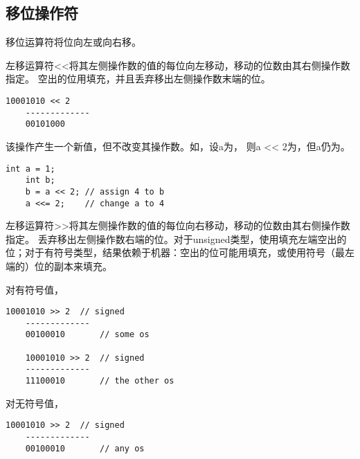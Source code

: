 \subsection{移位操作符}
\begin{frame}
  移位运算符将位向左或向右移。
\end{frame}

\begin{frame}
   \vspace{.1in}

  左移运算符{\tf <<}将其左侧操作数的值的每位向左移动，移动的位数由其右侧操作数指定。
  空出的位用{}填充，并且丢弃移出左侧操作数末端的位。
\end{frame}

\begin{frame}[fragile]
  \begin{lstlisting}[backgroundcolor=\color{red!20}]
    10001010 << 2
    -------------
    00101000
  \end{lstlisting}
  该操作产生一个新值，但不改变其操作数。如，设{\tf a}为{}，
  则{\tf a << 2}为{}，但{\tf a}仍为{}。

  \vspace{.1in}

  \begin{lstlisting}[backgroundcolor=\color{red!20}]
    int a = 1;
    int b;
    b = a << 2; // assign 4 to b
    a <<= 2;    // change a to 4
  \end{lstlisting}
\end{frame}

\begin{frame}
   \vspace{.1in}

  左移运算符{\tf >>}将其左侧操作数的值的每位向右移动，移动的位数由其右侧操作数指定。
  丢弃移出左侧操作数右端的位。对于{\tf unsigned}类型，使用{}填充左端空出的位；对于有符号类型，结果依赖于机器：空出的位可能用{}填充，或使用符号（最左端的）位的副本来填充。
\end{frame}

\begin{frame}[fragile]
  对有符号值，
  \begin{lstlisting}[backgroundcolor=\color{red!20}]
    10001010 >> 2  // signed
    -------------
    00100010       // some os

    10001010 >> 2  // signed
    -------------
    11100010       // the other os
  \end{lstlisting}
  对无符号值，
  \begin{lstlisting}[backgroundcolor=\color{red!20}]
    10001010 >> 2  // signed
    -------------
    00100010       // any os
  \end{lstlisting}

\end{frame}


